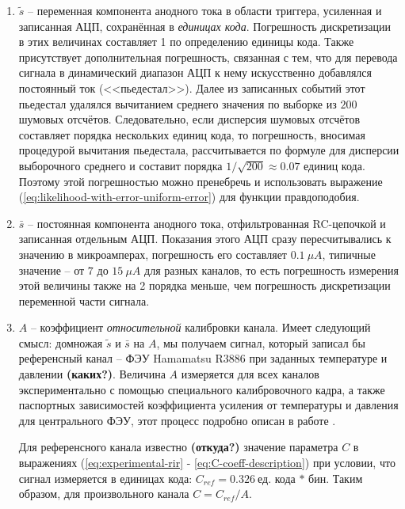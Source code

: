 \documentclass[12pt]{book}
\begin{document}
	\begin{enumerate}
		\item $\tilde{s}$ -- переменная компонента анодного тока в области триггера, усиленная и записанная АЦП, сохранённая в \textit{единицах кода}. Погрешность дискретизации в этих величинах составляет 1 по определению единицы кода. Также присутствует дополнительная погрешность, связанная с тем, что для перевода  сигнала в динамический диапазон АЦП к нему искусственно добавлялся постоянный ток (<<пьедестал>>). Далее из записанных событий этот пьедестал удалялся вычитанием среднего значения по выборке из $200$ шумовых отсчётов. Следовательно, если дисперсия шумовых отсчётов составляет порядка нескольких единиц кода, то погрешность, вносимая процедурой вычитания пьедестала, рассчитывается по формуле для дисперсии выборочного среднего и составит порядка $1 / \sqrt{200} \approx 0.07$ единиц кода. Поэтому этой погрешностью можно пренебречь и использовать выражение (\ref{eq:likelihood-with-error-uniform-error}) для функции правдоподобия.

		\item $\bar{s}$ -- постоянная компонента анодного тока, отфильтрованная RC-цепочкой и записанная отдельным АЦП. Показания этого АЦП сразу пересчитывались к значению в микроамперах, погрешность его составляет $0.1~\mu A$, типичные значение -- от $7$ до $15~\mu A$ для разных каналов, то есть погрешность измерения этой величины также на 2 порядка меньше, чем погрешность дискретизации переменной части сигнала.

		\item $A$ -- коэффициент \textit{относительной} калибровки канала. Имеет следующий смысл: домножая $\tilde{s}$ и $\bar{s}$ на $A$, мы получаем сигнал, который записал бы референсный канал -- ФЭУ Hamamatsu R3886 при заданных температуре и давлении \textbf{(каких?)}. Величина $A$ измеряется для всех каналов экспериментально с помощью специального калибровочного кадра, а также паспортных зависимостей коэффициента усиления от температуры и давления для центрального ФЭУ, этот процесс подробно описан в работе \cite{SphereCalibration2016}. 

		Для референсного канала известно \textbf{(откуда?)} значение параметра $C$ в выражениях (\ref{eq:experimental-rir} - \ref{eq:C-coeff-description}) при условии, что сигнал измеряется в единицах кода: $C_{ref} = 0.326~\text{ед. кода} \, * \, \text{бин}$. Таким образом, для произвольного канала $C = C_{ref} / A$.
	\end{enumerate}
\end{document}
